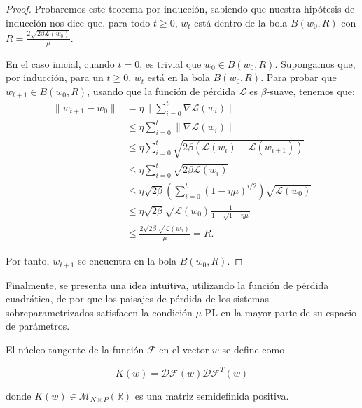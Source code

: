 \begin{proof}
    Probaremos este teorema por inducción, sabiendo que nuestra hipótesis de inducción nos dice que, para todo $t \geq 0$, $w_t$ está dentro de la bola $B(w_0, R)$ con $R = \frac{2\sqrt{2\beta \mathcal{L}(w_0)}}{\mu}$.\newline

    En el caso inicial, cuando $t = 0$, es trivial que $w_0 \in B(w_0, R)$. Supongamos que, por inducción, para un $t \geq 0$, $w_t$ está en la bola $B(w_0, R)$. Para probar que $w_{t+1} \in B(w_0, R)$, usando que la función de pérdida $\mathcal{L}$ es $\beta$-suave, tenemos que:
    \begin{align}
        \| w_{t+1} - w_0 \| &= \eta \bigg\| \sum_{i=0}^{t} \nabla \mathcal{L}(w_i) \bigg\| \\
        &\leq \eta \sum_{i=0}^{t} \| \nabla \mathcal{L}(w_i) \| \\
        &\leq \eta \sum_{i=0}^{t} \sqrt{2 \beta (\mathcal{L}(w_i) - \mathcal{L}(w_{i+1}))} \\
        &\leq \eta \sum_{i=0}^{t} \sqrt{2 \beta \mathcal{L}(w_i)} \\
        &\leq \eta \sqrt{2\beta} \left( \sum_{i=0}^{t} (1 - \eta \mu)^{i/2} \right) \sqrt{\mathcal{L}(w_0)} \\
        &\leq \eta \sqrt{2\beta} \sqrt{\mathcal{L}(w_0)} \frac{1}{1 - \sqrt{1 - \eta \mu}} \\
        &\leq \frac{2 \sqrt{2\beta} \sqrt{\mathcal{L}(w_0)}}{\mu} = R.
    \end{align}

    Por tanto, $w_{t+1}$ se encuentra en la bola $B(w_0, R)$.\newline
\end{proof}

Finalmente, se presenta una idea intuitiva, utilizando la función de pérdida cuadrática, de por que los paisajes de pérdida de los sistemas sobreparametrizados satisfacen la condición $\mu$-PL en la mayor parte de su espacio de parámetros.\newline

\begin{definicion}
    El núcleo tangente de la función $\mathcal{F}$ en el vector $w$ se define como

    \[
        K(w) = \mathcal{DF}(w)\mathcal{DF}^{T}(w)
    \]

    donde $K(w) \in \mathcal{M}_{N \times P}(\mathbb{R})$ es una matriz semidefinida positiva.\newline
\end{definicion}

